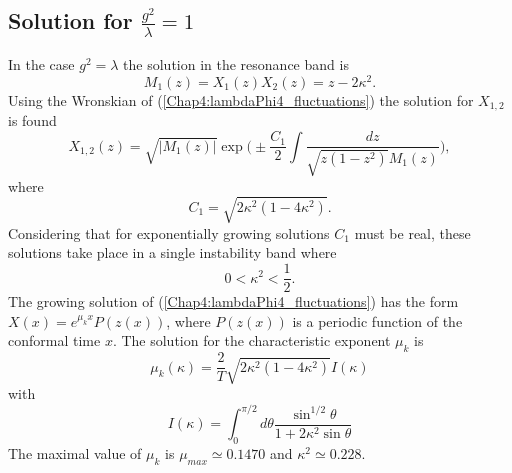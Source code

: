 \documentclass[11pt,a4paper,twoside]{book}
\begin{document}
\subsection*{Solution for $ \frac{g^{2}}{\lambda}=1 $}
In the case $ g^{2}=\lambda $  the solution in the resonance band is 
\begin{equation}
\label{Chap4:lambdaPhi4_solution
Mz1}
M_{1}(z) = X_{1}(z)X_{2}(z) = z-2\kappa^{2}.
\end{equation}
Using the Wronskian of (\ref{Chap4:lambdaPhi4_fluctuations}) the solution for $ X_{1,2} $ is found
\begin{equation}
\label{Chap4:lambdaPhi4_fisrstSolution}
X_{1,2}(z)=\sqrt{|M_{1}(z)|}\exp\Bigg(\pm \frac{C_{1}}{2}\int \frac{dz}{\sqrt{z(1-z^{2})} M_{1}(z)}\Bigg),
\end{equation}
where
\begin{equation}
\label{Chap4:lambdaPhi4_C1}
C_{1}=\sqrt{2\kappa^{2}(1-4\kappa^{2})}.
\end{equation}
Considering that for exponentially growing solutions $ C_{1} $ must be real, these solutions take place in a single instability band where
\begin{equation}
\label{Chap4:lambdaPhi4_bandSolution1}
0 < \kappa^{2} < \frac{1}{2}.
\end{equation}
The growing solution of (\ref{Chap4:lambdaPhi4_fluctuations}) has the form $ X(x) = e^{\mu_{k} x}P(z(x)) $, where $ P(z(x)) $ is a periodic function of the conformal time $ x $. The solution for the characteristic exponent $ \mu_{k} $ is
\begin{equation}
\label{Chap4:lambdaPhi4_rateSolution1}
\mu_{k}(\kappa)=\frac{2}{T}\sqrt{2\kappa^{2}(1-4\kappa^{2})}I(\kappa)
\end{equation}
with
\begin{equation}
\label{Chap4:lambdaPhi4_auxiliaryFunction}
I(\kappa)=\int_{0}^{\pi/2} d\theta \frac{\sin^{1/2}\theta}{1+2\kappa^{2}\sin \theta}
\end{equation}
The maximal value of $ \mu_{k} $ is $\mu_{max} \simeq 0.1470$ and $\kappa^{2}\simeq 0.228$.
\end{document}
